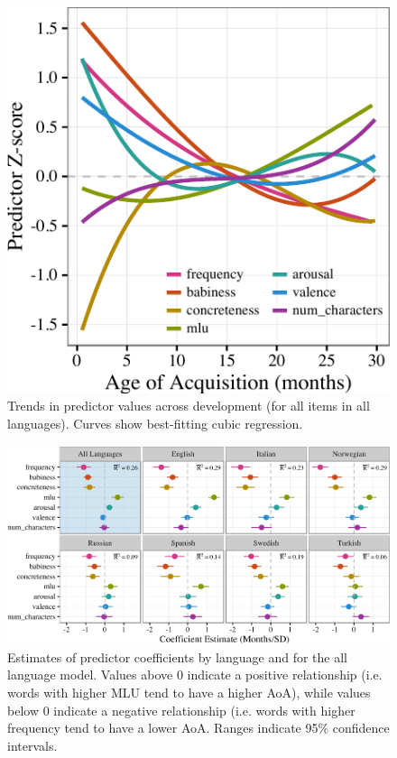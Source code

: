 \documentclass[10pt, letterpaper]{article}
\newenvironment{CodeChunk}{}{}
\begin{document}
\begin{CodeChunk}
\begin{figure}[!hb]

{\centering \includegraphics{figs/devo-1} 

}

\caption[Trends in predictor values across development (for all items in all languages)]{Trends in predictor values across development (for all items in all languages). Curves show best-fitting cubic regression.}\label{fig:devo}
\end{figure}
\end{CodeChunk}

\begin{CodeChunk}
\begin{figure}[tb]

{\centering \includegraphics{figs/coefs-1} 

}

\caption[Estimates of predictor coefficients by language and for the all language model]{Estimates of predictor coefficients by language and for the all language model. Values above 0 indicate a positive relationship (i.e. words with higher MLU tend to have a higher AoA), while values below 0 indicate a negative relationship (i.e. words with higher frequency tend to have a lower AoA. Ranges indicate 95\% confidence intervals.}\label{fig:coefs}
\end{figure}
\end{CodeChunk}
\end{document}
